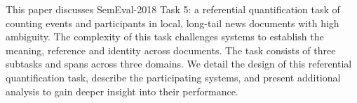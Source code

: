 This paper discusses SemEval-2018 Task 5: a referential quantification task of counting events and participants in local, long-tail news documents with high ambiguity. The complexity of this task challenges systems to establish the meaning, reference and identity across documents. The task consists of three subtasks and spans across three domains. We detail the design of this referential quantification task, describe the participating systems, and present additional analysis to gain deeper insight into their performance.
